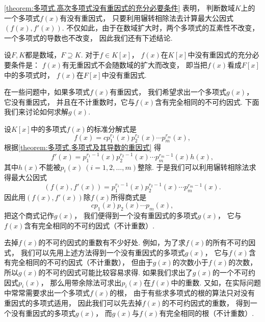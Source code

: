 \cref{theorem:多项式.高次多项式没有重因式的充分必要条件} 表明，
判断数域\(K\)上的一个多项式\(f(x)\)有没有重因式，
只要利用辗转相除法去计算最大公因式\((f(x),f'(x))\).
不仅如此，由于在数域扩大时，两个多项式的互素性不改变，一个多项式的导数也不改变，
因此我们还有下述结论.

\begin{proposition}
设\(F,K\)都是数域，\(F \supseteq K\).
对于\(f \in K[x]\)，
\(f(x)\)在\(K[x]\)中没有重因式的充分必要条件是：
\(f(x)\)有无重因式不会随数域的扩大而改变，
即当把\(f(x)\)看成\(F[x]\)中的多项式时，
\(f(x)\)在\(F[x]\)中没有重因式.
\end{proposition}

在一些问题中，如果多项式\(f(x)\)有重因式，
我们希望求出一个多项式\(g(x)\)，
它没有重因式，
并且在不计重数时，它与\(f(x)\)含有完全相同的不可约因式.
下面我们来讨论如何求解\(g(x)\).

设\(K[x]\)中的多项式\(f(x)\)的标准分解式是\begin{equation*}
	f(x) = c p_1^{r_1}(x) p_2^{r_2}(x) \dotsm p_m^{r_m}(x),
\end{equation*}
根据\cref{theorem:多项式.多项式及其导数的重因式} 得\begin{equation*}
	f'(x) = p_1^{r_1-1}(x) p_2^{r_2-1}(x) \dotsm p_m^{r_m-1}(x) h(x),
\end{equation*}
其中\(h(x)\)不能被\(p_i(x)\ (i=1,2,\dotsc,m)\)整除.
于是我们可以利用辗转相除法求得最大公因式\begin{equation*}
	(f(x),f'(x))
	= p_1^{r_1-1}(x) p_2^{r_2-1}(x) \dotsm p_m^{r_m-1}(x).
\end{equation*}
因此用\((f(x),f'(x))\)除\(f(x)\)所得商式是\begin{equation*}
	c p_1(x) p_2(x) \dotsm p_m(x),
\end{equation*}
把这个商式记作\(g(x)\)，
我们便得到一个没有重因式的多项式\(g(x)\)，
它与\(f(x)\)含有完全相同的不可约因式（不计重数）.

去掉\(f(x)\)的不可约因式的重数有不少好处.
例如，为了求\(f(x)\)的所有不可约因式，
我们可以先用上述方法得到一个没有重因式的多项式\(g(x)\)，
它与\(f(x)\)含有完全相同的不可约因式（不计重数），
但由于\(g(x)\)的次数小于\(f(x)\)的次数，
所以\(g(x)\)的不可约因式可能比较容易求得.
如果我们求出了\(g(x)\)的一个不可约因式\(p_i(x)\)，
那么用带余除法可求出\(p_i(x)\)在\(f(x)\)中的重数.
又如，在实际问题中常常需要求出一个多项式\(f(x)\)的根，
由于有些求多项式的根的算法只对没有重因式的多项式适用，
因此我们可以先去掉\(f(x)\)的不可约因式的重数，
得到一个没有重因式的多项式\(g(x)\)，
而\(g(x)\)与\(f(x)\)有完全相同的根（不计重数）.

